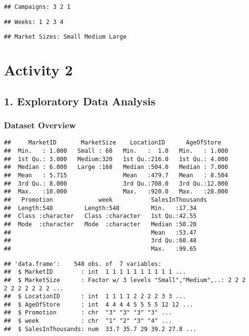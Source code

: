 \documentclass[
]{article}
\begin{document}
\begin{verbatim}
## Campaigns: 3 2 1
\end{verbatim}

\begin{verbatim}
## Weeks: 1 2 3 4
\end{verbatim}

\begin{verbatim}
## Market Sizes: Small Medium Large
\end{verbatim}

\section{Activity 2}\label{activity-2}

\subsection{1. Exploratory Data
Analysis}\label{exploratory-data-analysis}

\subsubsection{Dataset Overview}\label{dataset-overview}

\begin{verbatim}
##     MarketID       MarketSize    LocationID      AgeOfStore    
##  Min.   : 1.000   Small : 60   Min.   :  1.0   Min.   : 1.000  
##  1st Qu.: 3.000   Medium:320   1st Qu.:216.0   1st Qu.: 4.000  
##  Median : 6.000   Large :168   Median :504.0   Median : 7.000  
##  Mean   : 5.715                Mean   :479.7   Mean   : 8.504  
##  3rd Qu.: 8.000                3rd Qu.:708.0   3rd Qu.:12.000  
##  Max.   :10.000                Max.   :920.0   Max.   :28.000  
##   Promotion             week           SalesInThousands
##  Length:548         Length:548         Min.   :17.34   
##  Class :character   Class :character   1st Qu.:42.55   
##  Mode  :character   Mode  :character   Median :50.20   
##                                        Mean   :53.47   
##                                        3rd Qu.:60.48   
##                                        Max.   :99.65
\end{verbatim}

\begin{verbatim}
## 'data.frame':    548 obs. of  7 variables:
##  $ MarketID        : int  1 1 1 1 1 1 1 1 1 1 ...
##  $ MarketSize      : Factor w/ 3 levels "Small","Medium",..: 2 2 2 2 2 2 2 2 2 2 ...
##  $ LocationID      : int  1 1 1 1 2 2 2 2 3 3 ...
##  $ AgeOfStore      : int  4 4 4 4 5 5 5 5 12 12 ...
##  $ Promotion       : chr  "3" "3" "3" "3" ...
##  $ week            : chr  "1" "2" "3" "4" ...
##  $ SalesInThousands: num  33.7 35.7 29 39.2 27.8 ...
\end{verbatim}
\end{document}
